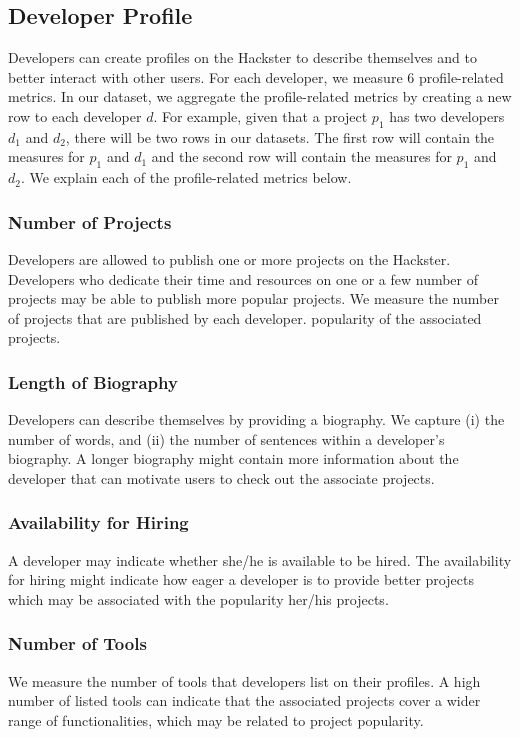 \subsection{Developer Profile}

Developers can create profiles on the Hackster to describe themselves and to
better interact with other users. For each developer, we measure $6$
profile-related metrics. In our dataset, we aggregate the profile-related
metrics by creating a new row to each developer $d$. For example, given that a
project $p_1$ has two developers $d_1$ and $d_2$, there will be two rows in our
datasets. The first row will contain the measures for $p_1$ and $d_1$ and the
second row will contain the measures for $p_1$ and $d_2$. We explain each of
the profile-related metrics below.

\subsubsection*{Number of Projects} Developers are allowed to publish one or
more projects on the Hackster.  Developers who dedicate their time and
resources on one or a few number of projects may be able to publish more
popular projects.  We measure the number of projects that are published by each
developer.%
popularity of the associated projects.

\subsubsection*{Length of Biography} Developers can describe themselves by
providing a biography.  We capture (i) the number of words, and (ii) the number
of sentences within a developer's biography. A longer biography might contain
more information about the developer that can motivate users to check out the
associate projects.

\subsubsection*{Availability for Hiring} A developer may indicate whether
she/he is available to be hired. The availability for hiring might indicate how
eager a developer is to provide better projects which may be associated with
the popularity her/his projects.

\subsubsection*{Number of Tools} We measure the number of tools that developers
list on their profiles. A high number of listed tools can indicate that the
associated projects cover a wider range of functionalities, which may be
related to project popularity.

